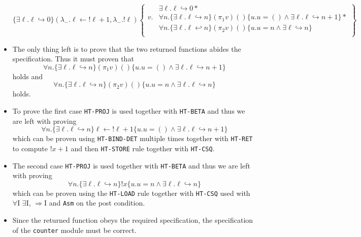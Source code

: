 \begin{itemize}
  \begin{equation*}
    \{\exists \ell . \ell \hookrightarrow 0 \}\left(\lambda_{-}. \ell \leftarrow !\ell+1, \lambda_{-}. ! \ell\right) \left\{
    \begin{split} 
         & \exists \ell. \ell \hookrightarrow 0  * \\
      v. & \forall n. \{\exists \ell. \ell \hookrightarrow n\} (\pi_1 v)() \{u.u=() \land \exists \ell. \ell \hookrightarrow n+1\} * \\
         & \forall n. \{\exists \ell. \ell \hookleftarrow n\} (\pi_2 v) () \{u.u=n \land \exists \ell \hookrightarrow n\}  \\
    \end{split}
    \right\}
  \end{equation*}
  \item The only thing left is to prove that the two returned functions abides the specification. Thus it must proven that
  \begin{equation*}
    \forall n. \{\exists \ell. \ell \hookrightarrow n\} (\pi_1 v)() \{u.u=() \land \exists \ell. \ell \hookrightarrow n+1\}
  \end{equation*} 
  holds and
  \begin{equation*}
    \forall n. \{\exists \ell. \ell \hookrightarrow n\} (\pi_2 v) () \{u.u=n \land \exists \ell . \ell \hookrightarrow n\}
  \end{equation*}
  holds.
  \item To prove the first case \texttt{HT-PROJ} is used together with \texttt{HT-BETA} and thus we are left with proving 
  \begin{equation*}
    \forall n. \{\exists \ell. \ell \hookrightarrow n\} \ell \leftarrow !\ell +1 \{u.u=() \land \exists \ell. \ell \hookrightarrow n+1\}
  \end{equation*} 
  which can be proven using \texttt{HT-BIND-DET} multiple times together with \texttt{HT-RET} to compute $!x+1$ and then \texttt{HT-STORE} rule together with \texttt{HT-CSQ}. \smallskip \\
  \item The second case \texttt{HT-PROJ} is used together with \texttt{HT-BETA} and thus we are left with proving 
  \begin{equation*}
    \forall n. \{\exists \ell. \ell \hookrightarrow n\} ! x \{u.u=n \land \exists \ell. \ell \hookrightarrow n\}
  \end{equation*} 
  which can be proven using the \texttt{HT-LOAD} rule together with \texttt{HT-CSQ} used with $\forall$I $\exists$I, $\Rightarrow$I and \texttt{Asm} on the post condition.
  \item Since the returned function obeys the required specification, the specification of the \texttt{counter} module must be correct. 
\end{itemize}

\newpage
